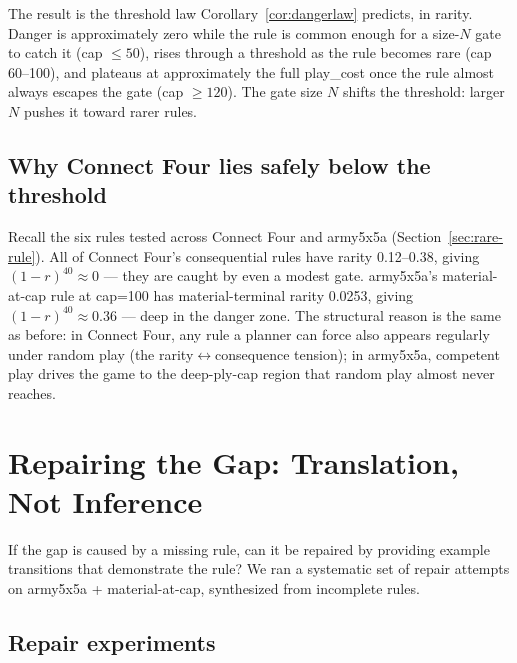 \documentclass[11pt]{article}
\theoremstyle{remark}
\begin{document}
The result is the threshold law Corollary~\ref{cor:dangerlaw} predicts, in rarity. Danger is approximately zero while the rule is common enough for a size-$N$ gate to catch it (cap $\leq 50$), rises through a threshold as the rule becomes rare (cap 60--100), and plateaus at approximately the full play\_cost once the rule almost always escapes the gate (cap $\geq 120$). The gate size $N$ shifts the threshold: larger $N$ pushes it toward rarer rules.

\subsection{Why Connect Four lies safely below the threshold}

Recall the six rules tested across Connect Four and army5x5a (Section~\ref{sec:rare-rule}). All of Connect Four's consequential rules have rarity 0.12--0.38, giving $(1-r)^{40} \approx 0$ --- they are caught by even a modest gate. army5x5a's material-at-cap rule at cap=100 has material-terminal rarity 0.0253, giving $(1-r)^{40} \approx 0.36$ --- deep in the danger zone. The structural reason is the same as before: in Connect Four, any rule a planner can force also appears regularly under random play (the rarity$\leftrightarrow$consequence tension); in army5x5a, competent play drives the game to the deep-ply-cap region that random play almost never reaches.

\section{Repairing the Gap: Translation, Not Inference}
\label{sec:repair}

If the gap is caused by a missing rule, can it be repaired by providing example transitions that demonstrate the rule? We ran a systematic set of repair attempts on army5x5a + material-at-cap, synthesized from incomplete rules.

\subsection{Repair experiments}
\end{document}
